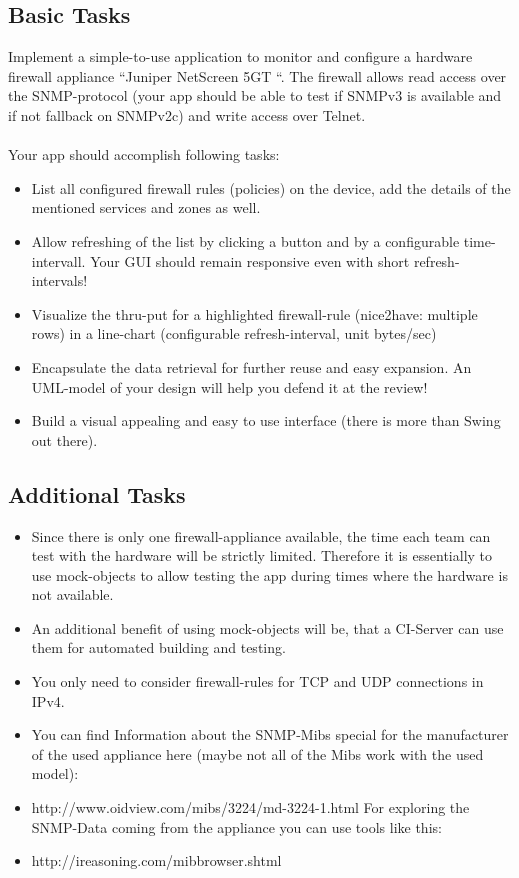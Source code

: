 \documentclass[11pt, a4paper]{article}
\begin{document}
\subsection{Basic Tasks}
Implement a simple-to-use application to monitor and configure a hardware firewall appliance “Juniper NetScreen 5GT “. The firewall allows read access over the SNMP-protocol (your app should be able to test if SNMPv3 is available and if not fallback on SNMPv2c) and write access over Telnet.
\\\\
Your app should accomplish following tasks:
\begin{itemize}
\item List all configured firewall rules (policies) on the device, add the details of the mentioned services and zones as well.
\item Allow refreshing of the list by clicking a button and by a configurable time-intervall. Your GUI should remain responsive even with short refresh-intervals!
\item Visualize the thru-put for a highlighted firewall-rule (nice2have: multiple rows) in a line-chart (configurable refresh-interval, unit bytes/sec)
\item Encapsulate the data retrieval for further reuse and easy expansion. An UML-model of your design will help you defend it at the review!
\item Build a visual appealing and easy to use interface (there is more than Swing out there).
\end{itemize} 

\subsection{Additional Tasks}
\begin{itemize}
\item Since there is only one firewall-appliance available, the time each team can test with the hardware will be strictly limited. Therefore it is essentially to use mock-objects to allow testing the app during times where the hardware is not available.
\item An additional benefit of using mock-objects will be, that a CI-Server can use them for automated building and testing.
\item You only need to consider firewall-rules for TCP and UDP connections in IPv4.
\item You can find Information about the SNMP-Mibs special for the manufacturer of the used appliance here (maybe not all of the Mibs work with the used model): 
\item http://www.oidview.com/mibs/3224/md-3224-1.html
For exploring the SNMP-Data coming from the appliance you can use tools like this:
\item http://ireasoning.com/mibbrowser.shtml
\end{itemize} 
\end{document}
